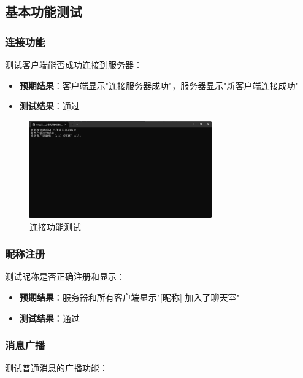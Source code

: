 \documentclass[12pt, a4paper]{article}
\begin{document}
\subsection{基本功能测试}

\subsubsection{连接功能}

测试客户端能否成功连接到服务器：

\begin{itemize}[itemsep=3pt]
  \item \textbf{预期结果}：客户端显示"连接服务器成功"，服务器显示"新客户端连接成功"
  \item \textbf{测试结果}：通过
\end{itemize}

\begin{figure}[H]
   \centering
   \includegraphics[width=0.7\textwidth]{pic/server_runing.png}
   \caption{连接功能测试}
   \label{fig:connection_test}
\end{figure}

\subsubsection{昵称注册}

测试昵称是否正确注册和显示：

\begin{itemize}[itemsep=3pt]
  \item \textbf{预期结果}：服务器和所有客户端显示"[昵称] 加入了聊天室"
  \item \textbf{测试结果}：通过
\end{itemize}

\subsubsection{消息广播}

测试普通消息的广播功能：
\end{document}
